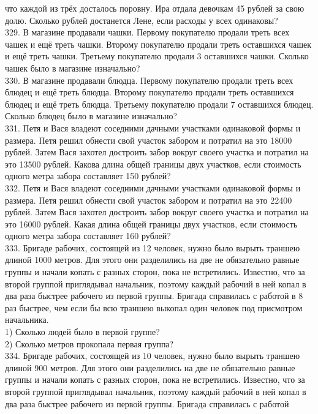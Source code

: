 что каждой из трёх досталось поровну. Ира отдала девочкам 45 рублей за свою долю. Сколько рублей достанется Лене, если расходы у всех одинаковы?\\
329. В магазине продавали чашки. Первому покупателю продали треть всех чашек и ещё треть чашки. Второму покупателю продали треть оставшихся чашек и ещё
треть чашки. Третьему покупателю продали 3 оставшихся чашки. Сколько чашек было в магазине изначально?\\
330. В магазине продавали блюдца. Первому покупателю продали треть всех блюдец и ещё треть блюдца. Второму покупателю продали треть оставшихся блюдец
и ещё треть блюдца. Третьему покупателю продали 7 оставшихся блюдец. Сколько блюдец было в магазине изначально?\\
331. Петя и Вася владеют соседними дачными участками одинаковой формы и размера. Петя решил
обнести свой участок забором и потратил на это 18000 рублей. Затем Вася захотел достроить забор
вокруг своего участка и потратил на это 13500 рублей. Какова длина общей границы двух участков,
если стоимость одного метра забора составляет 150 рублей?\\
332.  Петя и Вася владеют соседними дачными участками одинаковой формы и размера. Петя решил
обнести свой участок забором и потратил на это 22400 рублей. Затем Вася захотел достроить забор
вокруг своего участка и потратил на это 16000 рублей. Какая длина общей границы двух участков,
если стоимость одного метра забора составляет 160 рублей?\\
333.  Бригаде рабочих, состоящей из 12 человек, нужно было вырыть траншею длиной 1000 метров.
Для этого они разделились на две не обязательно равные группы и начали копать с разных сторон,
пока не встретились. Известно, что за второй группой приглядывал начальник, поэтому каждый
рабочий в ней копал в два раза быстрее рабочего из первой группы. Бригада справилась с работой
в 8 раз быстрее, чем если бы всю траншею выкопал один человек под присмотром начальника.\\
1) Сколько людей было в первой группе?\\
2) Сколько метров прокопала первая группа?\\
334. Бригаде рабочих, состоящей из 10 человек, нужно было вырыть траншею длиной 900 метров.
Для этого они разделились на две не обязательно равные группы и начали копать с разных сторон,
пока не встретились. Известно, что за второй группой приглядывал начальник, поэтому каждый
рабочий в ней копал в два раза быстрее рабочего из первой группы. Бригада справилась с работой
